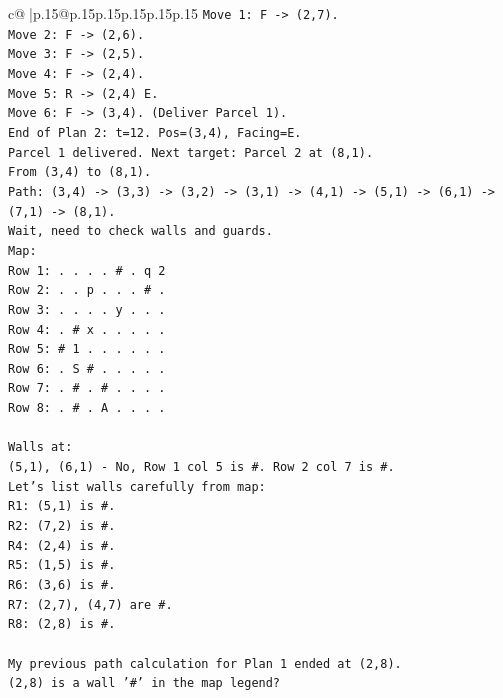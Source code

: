 \documentclass{article}
\begin{document}
{\begin{supertabular}{c@{$\;$}|p{.15\linewidth}@{}p{.15\linewidth}p{.15\linewidth}p{.15\linewidth}p{.15\linewidth}p{.15\linewidth}}
{{{\texttt{Move 1: F {-}> (2,7).} \\
\texttt{Move 2: F {-}> (2,6).} \\
\texttt{Move 3: F {-}> (2,5).} \\
\texttt{Move 4: F {-}> (2,4).} \\
\texttt{Move 5: R {-}> (2,4) E.} \\
\texttt{Move 6: F {-}> (3,4). (Deliver Parcel 1).} \\
\texttt{End of Plan 2: t=12. Pos=(3,4), Facing=E.} \\
\texttt{Parcel 1 delivered. Next target: Parcel 2 at (8,1).} \\
\texttt{From (3,4) to (8,1).} \\
\texttt{Path: (3,4) {-}> (3,3) {-}> (3,2) {-}> (3,1) {-}> (4,1) {-}> (5,1) {-}> (6,1) {-}> (7,1) {-}> (8,1).} \\
\texttt{Wait, need to check walls and guards.} \\
\texttt{Map:} \\
\texttt{Row 1: . . . . \# . q 2} \\
\texttt{Row 2: . . p . . . \# .} \\
\texttt{Row 3: . . . . y . . .} \\
\texttt{Row 4: . \# x . . . . .} \\
\texttt{Row 5: \# 1 . . . . . .} \\
\texttt{Row 6: . S \# . . . . .} \\
\texttt{Row 7: . \# . \# . . . .} \\
\texttt{Row 8: . \# . A . . . .} \\
\\ 
\texttt{Walls at:} \\
\texttt{(5,1), (6,1) {-} No, Row 1 col 5 is \#. Row 2 col 7 is \#.} \\
\texttt{Let's list walls carefully from map:} \\
\texttt{R1: (5,1) is \#.} \\
\texttt{R2: (7,2) is \#.} \\
\texttt{R4: (2,4) is \#.} \\
\texttt{R5: (1,5) is \#.} \\
\texttt{R6: (3,6) is \#.} \\
\texttt{R7: (2,7), (4,7) are \#.} \\
\texttt{R8: (2,8) is \#.} \\
\\ 
\texttt{My previous path calculation for Plan 1 ended at (2,8).} \\
\texttt{(2,8) is a wall '\#' in the map legend?} \\
}}}
\end{supertabular}}
\end{document}
